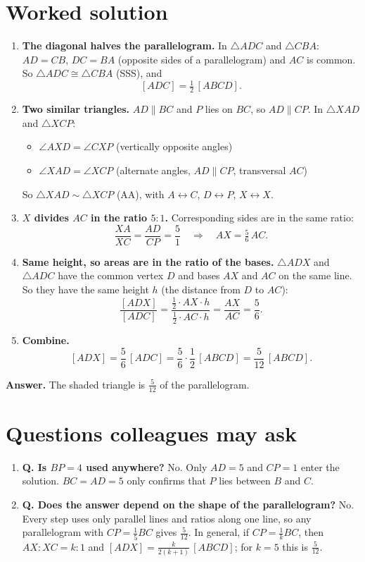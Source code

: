 \documentclass[11pt,a4paper]{article}
\begin{document}
\section{Worked solution}
\begin{enumerate}
  \item \textbf{The diagonal halves the parallelogram.}
        In $\triangle ADC$ and $\triangle CBA$: $AD = CB$, $DC = BA$ (opposite sides of a
        parallelogram) and $AC$ is common. So $\triangle ADC \cong \triangle CBA$ (SSS), and
        \[ [ADC] = \tfrac12\,[ABCD]. \]
  \item \textbf{Two similar triangles.}
        $AD \parallel BC$ and $P$ lies on $BC$, so $AD \parallel CP$. In $\triangle XAD$ and
        $\triangle XCP$:
        \begin{itemize}
          \item $\angle AXD = \angle CXP$ \hfill (vertically opposite angles)
          \item $\angle XAD = \angle XCP$ \hfill (alternate angles, $AD \parallel CP$, transversal $AC$)
        \end{itemize}
        So $\triangle XAD \sim \triangle XCP$ (AA), with $A \leftrightarrow C$,
        $D \leftrightarrow P$, $X \leftrightarrow X$.
  \item \textbf{$X$ divides $AC$ in the ratio $5:1$.}
        Corresponding sides are in the same ratio:
        \[
          \frac{XA}{XC} = \frac{AD}{CP} = \frac{5}{1}
          \quad\Longrightarrow\quad AX = \tfrac56\,AC .
        \]
  \item \textbf{Same height, so areas are in the ratio of the bases.}
        $\triangle ADX$ and $\triangle ADC$ have the common vertex $D$ and bases $AX$ and $AC$
        on the same line. So they have the same height $h$ (the distance from $D$ to $AC$):
        \[
          \frac{[ADX]}{[ADC]} = \frac{\tfrac12\cdot AX\cdot h}{\tfrac12\cdot AC\cdot h}
          = \frac{AX}{AC} = \frac56 .
        \]
  \item \textbf{Combine.}
        \[
          [ADX] = \frac56\,[ADC] = \frac56\cdot\frac12\,[ABCD] = \frac{5}{12}\,[ABCD].
        \]
\end{enumerate}
\textbf{Answer.} The shaded triangle is $\boxed{\tfrac{5}{12}}$ of the parallelogram.

\section{Questions colleagues may ask}
\begin{enumerate}
  \item \textbf{Q. Is $BP = 4$ used anywhere?}
        No. Only $AD = 5$ and $CP = 1$ enter the solution. $BC = AD = 5$ only confirms that
        $P$ lies between $B$ and $C$.
  \item \textbf{Q. Does the answer depend on the shape of the parallelogram?}
        No. Every step uses only parallel lines and ratios along one line, so any
        parallelogram with $CP = \tfrac15 BC$ gives $\tfrac{5}{12}$. In general, if
        $CP = \tfrac1k BC$, then $AX : XC = k : 1$ and
        $[ADX] = \tfrac{k}{2(k+1)}\,[ABCD]$; for $k = 5$ this is $\tfrac{5}{12}$.
\end{enumerate}
\end{document}
